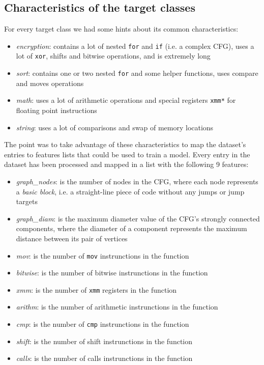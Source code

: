 \documentclass[11pt]{article}
\begin{document}
	\subsection{Characteristics of the target classes} \label{subsec:target-classes}
	For every target class we had some hints about its common characteristics:
	\begin{itemize}
		\item \textit{encryption}: contains a lot of nested \texttt{for} and
		\texttt{if} (i.e. a complex CFG), uses a lot of \texttt{xor}, shifts and
		bitwise operations, and is extremely long
		\item \textit{sort}: contains one or two nested \texttt{for} and some
		helper functions, uses compare and moves operations
		\item \textit{math}: uses a lot of arithmetic operations and special
		registers \texttt{xmm*} for floating point instructions
		\item \textit{string}: uses a lot of comparisons and swap of memory locations
	\end{itemize}
	The point was to take advantage of these characteristics to map the dataset's
	entries to features lists that could be used to train a model.
	Every entry in the dataset has been processed and mapped in a list with the
	following 9 features:
	\begin{itemize}
		\item \textit{graph\_nodes}: is the number of nodes in the CFG, where each
		node represents a \textit{basic block}, i.e. a straight-line piece of code
		without any jumps or jump targets
		\item \textit{graph\_diam}: is the maximum diameter value of the CFG's
		strongly connected components, where the diameter of a component represents
		the maximum distance between its pair of vertices
		\item \textit{mov}: is the number of \texttt{mov} instrunctions in the function
		\item \textit{bitwise}: is the number of bitwise instrunctions in the function
		\item \textit{xmm}: is the number of \texttt{xmm} registers in the function
		\item \textit{arithm}: is the number of arithmetic instrunctions in the function
		\item \textit{cmp}: is the number of \texttt{cmp} instrunctions in the function
		\item \textit{shift}: is the number of shift instrunctions in the function
		\item \textit{calls}: is the number of calls instrunctions in the function
	\end{itemize}	
\end{document}
